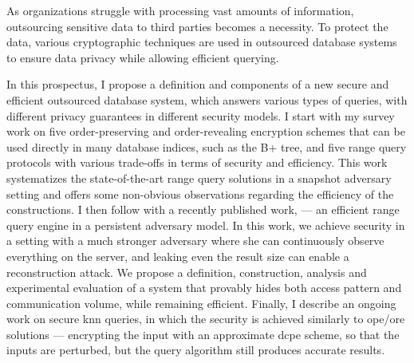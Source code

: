 As organizations struggle with processing vast amounts of information, outsourcing sensitive data to third parties becomes a necessity.
To protect the data, various cryptographic techniques are used in outsourced database systems to ensure data privacy while allowing efficient querying.

In this prospectus, I propose a definition and components of a new secure and efficient outsourced database system, which answers various types of queries, with different privacy guarantees in different security models.
I start with my survey work on five order-preserving and order-revealing encryption schemes that can be used directly in many database indices, such as the B+ tree, and five range query protocols with various trade-offs in terms of security and efficiency.
This work systematizes the state-of-the-art range query solutions in a snapshot adversary setting and offers some non-obvious observations regarding the efficiency of the constructions.
I then follow with a recently published work, \epsolute{} --- an efficient range query engine in a persistent adversary model.
In this work, we achieve security in a setting with a much stronger adversary where she can continuously observe everything on the server, and leaking even the result size can enable a reconstruction attack.
We propose a definition, construction, analysis and experimental evaluation of a system that provably hides both access pattern and communication volume, while remaining efficient.
Finally, I describe an ongoing work on secure \acrlong{knn} queries, in which the security is achieved similarly to \acrshort{ope}/\acrshort{ore} solutions --- encrypting the input with an approximate \acrlong{dcpe} scheme, so that the inputs are perturbed, but the query algorithm still produces accurate results.
